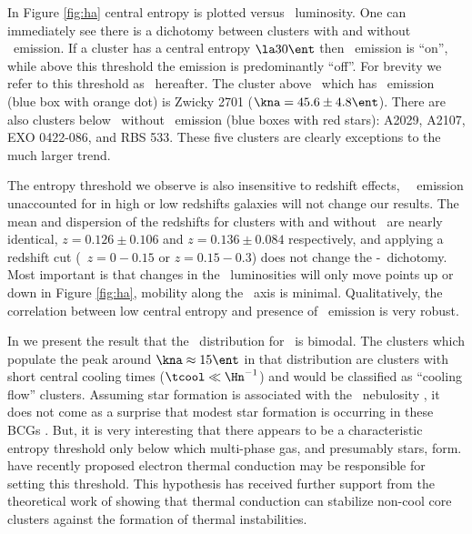 \documentclass{emulateapj}
\begin{document}
In Figure \ref{fig:ha} central entropy is plotted versus
\halpha\ luminosity. One can immediately see there is a dichotomy
between clusters with and without \halpha\ emission. If a cluster has
a central entropy $\la 30 \ent$ then \halpha\ emission is ``on'',
while above this threshold the emission is predominantly ``off''. For
brevity we refer to this threshold as \kthr\ hereafter. The cluster
above \kthr\ which has \halpha\ emission (blue box with orange dot) is
Zwicky 2701 ($\kna = 45.6 \pm 4.8 \ent$). There are also clusters
below \kthr\ without \halpha\ emission (blue boxes with red stars):
A2029, A2107, EXO 0422-086, and RBS 533. These five clusters are
clearly exceptions to the much larger trend.

The entropy threshold we observe is also insensitive to redshift
effects, \ie\ \halpha\ emission unaccounted for in high or low
redshifts galaxies will not change our results. The mean and
dispersion of the redshifts for clusters with and without \halpha\ are
nearly identical, $z = 0.126 \pm 0.106$ and $z = 0.136 \pm 0.084$
respectively, and applying a redshift cut (\ie\ $z = 0-0.15$ or $z =
0.15-0.3$) does not change the \kna-\halpha\ dichotomy. Most important
is that changes in the \halpha\ luminosities will only move points up
or down in Figure \ref{fig:ha}, mobility along the \kna\ axis is
minimal. Qualitatively, the correlation between low central entropy
and presence of \halpha\ emission is very robust.

In \cite{accept} we present the result that the \kna\ distribution for
\accept\ is bimodal. The clusters which populate the peak around $\kna
\approx 15 \ent$ in that distribution are clusters with short central
cooling times ($\tcool \ll \Hn^{-1}$) and would be classified as
``cooling flow'' clusters. Assuming star formation is associated with
the \halpha\ nebulosity \citep{voit97,cardiel98}, it does not come as
a surprise that modest star formation is occurring in these BCGs
\citep{johnstone87, mcnamara89}. But, it is very interesting that
there appears to be a characteristic entropy threshold only below
which multi-phase gas, and presumably stars, form. \cite{conduction}
have recently proposed electron thermal conduction may be responsible
for setting this threshold. This hypothesis has received further
support from the theoretical work of \cite{2008arXiv0804.3823G}
showing that thermal conduction can stabilize non-cool core clusters
against the formation of thermal instabilities.

\end{document}
